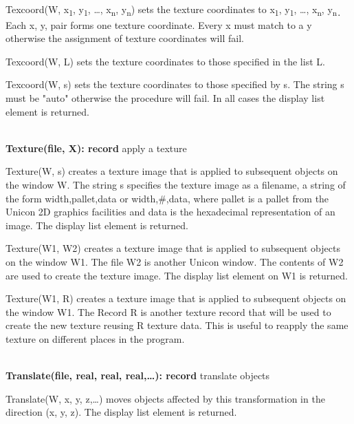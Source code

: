 \documentclass[letterpaper]{article}
\begin{document}
{\textsf{Texcoord(W, x}\textsf{\textsubscript{1}}\textsf{, y}\textsf{\textsubscript{1}}\textsf{, {\dots},
x}\textsf{\textsubscript{n}}\textsf{, y}\textsf{\textsubscript{n}}\textsf{) }sets the texture coordinates to
\textsf{x}\textsf{\textsubscript{1}}\textsf{, y}\textsf{\textsubscript{1}}\textsf{, {\dots},
x}\textsf{\textsubscript{n}}\textsf{, y}\textsf{\textsubscript{n}}\texttt{\textsubscript{. }}Each x, y, pair forms one
texture coordinate. Every x must match to a y otherwise the assignment of texture coordinates will fail.

\textsf{Texcoord(W, L)} sets the texture coordinates to those specified in the list \textsf{L}.

\textsf{Texcoord(W, s) }sets the texture coordinates to those
specified by \textsf{s}. The string \textsf{s} must be
\textsf{"auto"} otherwise the procedure will fail. In all cases
the display list element is returned.

\noindent\hrulefill\\
\noindent\textsf{\textbf{Texture(file, X): record}} \hfill apply a texture


\bigskip

\textsf{Texture(W, s) }creates a texture image that is applied to
subsequent objects on the window \textsf{W}. The string \textsf{s}
specifies the texture image as a filename, a string of the form
\textsf{width,pallet,data} or \textsf{width,\#,data}, where pallet is
a pallet from the Unicon 2D graphics facilities and data is the
hexadecimal representation of an image. The display list element is
returned.

\textsf{Texture(W1, W2) }creates a texture image that is applied to
subsequent objects on the window \textsf{W1}. The file \textsf{W2} is
another Unicon window. The contents of \textsf{W2} are used to create
the texture image. The display list element on \textsf{W1} is
returned.

\textsf{Texture(W1, R) }creates a texture image that is applied to
subsequent objects on the window \textsf{W1}. The Record \textsf{R} is
another texture record that will be used to create the new texture
reusing R texture data. This is useful to reapply the same texture on
different places in the program.

\noindent\hrulefill\\
\noindent\textsf{\textbf{Translate(file, real, real, real,{\dots}): record}}
\hfill translate objects


\bigskip

\textsf{Translate(W, x, y, z,{\dots})} moves objects affected by this
transformation in the direction (x, y, z). The display list element is
returned.

}
\end{document}
